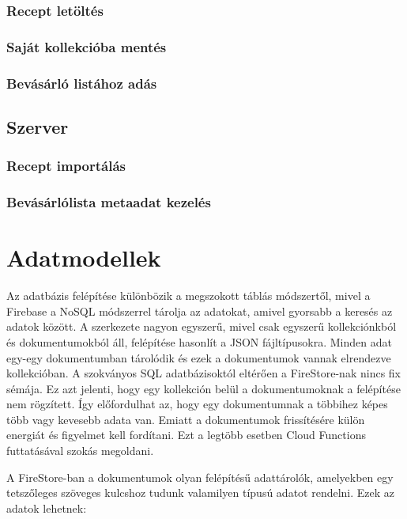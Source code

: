 \documentclass[12pt]{report}
\theoremstyle{definition}
\begin{document}
\subsection{Recept letöltés}

\subsection{Saját kollekcióba mentés}

\subsection{Bevásárló listához adás}

\section{Szerver}

\subsection{Recept importálás}

\subsection{Bevásárlólista metaadat kezelés}

\chapter{Adatmodellek}
\label{dataSchemes}
Az adatbázis felépítése különbözik a megszokott táblás módszertől, mivel a Firebase a NoSQL módszerrel tárolja az adatokat, amivel gyorsabb a keresés az adatok között. A szerkezete nagyon egyszerű, mivel csak egyszerű kollekciónkból és dokumentumokból áll, felépítése hasonlít a JSON fájltípusokra. Minden adat egy-egy dokumentumban tárolódik és ezek a dokumentumok vannak elrendezve kollekcióban. A szokványos SQL adatbázisoktól eltérően a FireStore-nak nincs fix sémája. Ez azt jelenti, hogy egy kollekción belül a dokumentumoknak a felépítése nem rögzített. Így előfordulhat az, hogy egy dokumentumnak a többihez képes több vagy kevesebb adata van. Emiatt a dokumentumok frissítésére külön energiát és figyelmet kell fordítani. Ezt a legtöbb esetben Cloud Functions futtatásával szokás megoldani.

A FireStore-ban a dokumentumok olyan felépítésű adattárolók, amelyekben egy tetszőleges szöveges kulcshoz tudunk valamilyen típusú adatot rendelni. Ezek az adatok lehetnek: 
\end{document}
